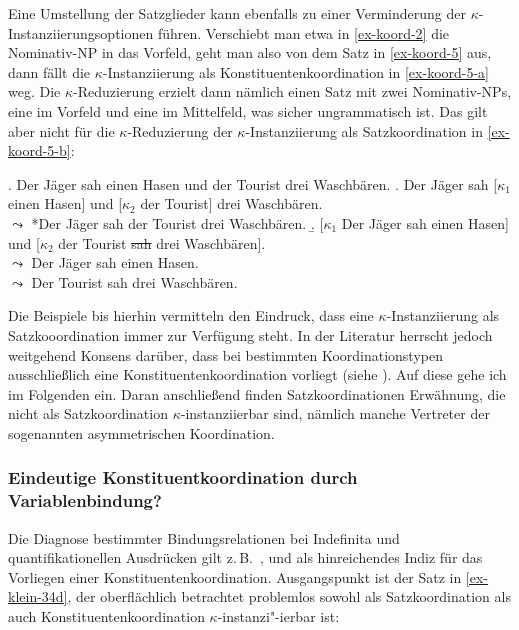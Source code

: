 Eine Umstellung der Satzglieder kann ebenfalls zu einer Verminderung der $\kappa$-Instanziierungs\-optionen führen. Verschiebt man etwa in \ref{ex-koord-2} die Nominativ-NP in das Vorfeld, geht man also von dem Satz in \ref{ex-koord-5} aus, dann fällt die $\kappa$-Instanziierung als Konstituentenkoordination in \ref{ex-koord-5-a} weg. Die $\kappa$-Reduzierung erzielt dann nämlich einen Satz mit zwei Nominativ-NPs, eine im Vorfeld und eine im Mittelfeld, was sicher ungrammatisch ist. Das gilt aber nicht für die $\kappa$-Reduzierung der $\kappa$-Instanziierung als Satzkoordination in \ref{ex-koord-5-b}:

\ex. \label{ex-koord-5} Der Jäger sah einen Hasen und der Tourist drei Waschbären.
\a. \label{ex-koord-5-a} Der Jäger sah [$\kappa_1$ einen Hasen] und [$\kappa_2$ der Tourist] drei Waschbären. \\
$\leadsto$ *Der Jäger sah der Tourist drei Waschbären.\pagebreak
\b. \label{ex-koord-5-b} [$\kappa_1$ Der Jäger sah einen Hasen] und [$\kappa_2$ der Tourist \sout{sah} drei Waschbären]. \\  
$\leadsto$ Der Jäger sah einen Hasen. \\
$\leadsto$ Der Tourist sah drei Waschbären.

Die Beispiele bis hierhin vermitteln den Eindruck, dass eine $\kappa$-Instanziierung als Satzkooordination immer zur Verfügung steht. In der Literatur herrscht jedoch weitgehend Konsens darüber, dass bei bestimmten Koordinationstypen ausschlie\ss lich eine Konstituentenkoordination vorliegt (siehe \citealt[Abschnitt~2.3]{Hartmann:00}). Auf diese gehe ich im Folgenden ein. Daran anschlie\ss end finden Satzkoordinationen Erwähnung, die nicht als Satzkoordination $\kappa$-instanziierbar sind, nämlich manche Vertreter der sogenannten asymmetrischen Koordination.   


\subsubsection*{Eindeutige Konstituentkoordination durch Variablenbindung?}

Die Diagnose bestimmter Bindungsrelationen bei Indefinita und quantifikationellen Ausdrü\-cken gilt z.\,B.\  \citet[773]{Klein:93}, \citet[33ff]{Hartmann:00} und \citet[31ff]{Reich:09} als hinreichendes Indiz für das Vorliegen einer Konstituentenkoordination. Ausgangspunkt ist der Satz in \ref{ex-klein-34d}, der oberflächlich betrachtet problemlos sowohl als Satzkoordination als auch Konstituentenkoordination $\kappa$-instanzi"-ierbar ist: 

